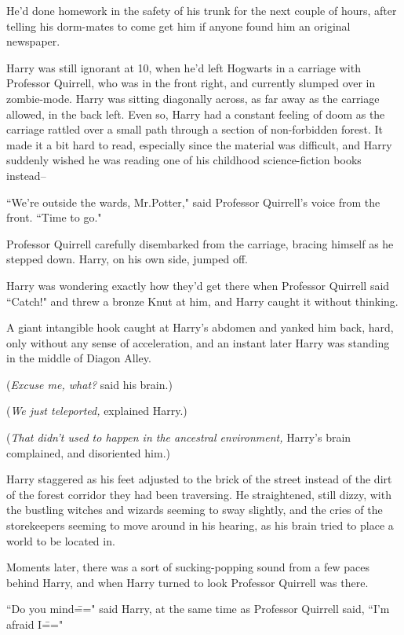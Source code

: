 He'd done homework in the safety of his trunk for the next couple of hours, after telling his dorm-mates to come get him if anyone found him an original newspaper.

Harry was still ignorant at 10\am, when he'd left Hogwarts in a carriage with Professor Quirrell, who was in the front right, and currently slumped over in zombie-mode. Harry was sitting diagonally across, as far away as the carriage allowed, in the back left. Even so, Harry had a constant feeling of doom as the carriage rattled over a small path through a section of non-forbidden forest. It made it a bit hard to read, especially since the material was difficult, and Harry suddenly wished he was reading one of his childhood science-fiction books instead\---

``We're outside the wards, Mr.\?Potter," said Professor Quirrell's voice from the front. ``Time to go."

Professor Quirrell carefully disembarked from the carriage, bracing himself as he stepped down. Harry, on his own side, jumped off.

Harry was wondering exactly how they'd get there when Professor Quirrell said ``Catch!" and threw a bronze Knut at him, and Harry caught it without thinking.

A giant intangible hook caught at Harry's abdomen and yanked him back, hard, only without any sense of acceleration, and an instant later Harry was standing in the middle of Diagon Alley.

(\emph{Excuse me, what?} said his brain.)

(\emph{We just teleported,} explained Harry.)

(\emph{That didn't used to happen in the ancestral environment,} Harry's brain complained, and disoriented him.)

Harry staggered as his feet adjusted to the brick of the street instead of the dirt of the forest corridor they had been traversing. He straightened, still dizzy, with the bustling witches and wizards seeming to sway slightly, and the cries of the storekeepers seeming to move around in his hearing, as his brain tried to place a world to be located in.

Moments later, there was a sort of sucking-popping sound from a few paces behind Harry, and when Harry turned to look Professor Quirrell was there.

``Do you mind\===" said Harry, at the same time as Professor Quirrell said, ``I'm afraid I\==="

